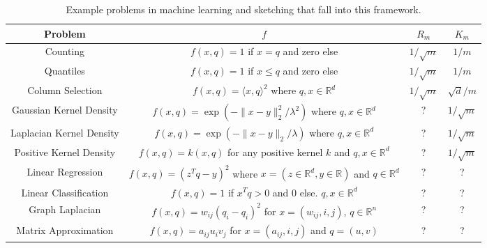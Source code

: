 \documentclass{article} %
\newcommand{\R}{\mathbb{R}}
\begin{document}
\newcommand{\ccc}[1]{\parbox}
\begin{table}[htp]
\begin{center}
\begin{tabular}{|c|c|c|c|} \hline
Problem				& $f$ 											& $R_m$ 			& $K_m$ \\ \hline
Counting 				& $f(x, q) = 1$ if $x=q$ and zero else 					& $1/\sqrt{m}$		& $1/m$ \\ \hline
Quantiles				& $f(x, q) = 1$ if $x\le q$ and zero else  					& $1/\sqrt{m}$		& $1/m$ \\ \hline
Column Selection		& $f(x, q) = \langle x,q \rangle ^2$ where  $q,x\in \R^d$		& $1/\sqrt{m}$		& $\sqrt{d}/m$ \\ \hline
Gaussian Kernel Density 			& $f(x, q) = \exp(- \|x-y\|_2^2/\lambda^2)$ where  $q,x\in \R^d$				& ? 		& $1/\sqrt{m}$ \\ \hline
Laplacian Kernel Density 			& $f(x, q) = \exp(- \|x-y\|_2/\lambda)$ where  $q,x\in \R^d$				& ? 		& $1/\sqrt{m}$ \\ \hline
Positive Kernel Density 			& $f(x, q) = k(x,q)$ for any positive kernel $k$ and $q,x\in \R^d$				& ? 		& $1/\sqrt{m}$ \\ \hline

Linear Regression		& $f(x,q) = (z^Tq - y)^2$ where $x = (z\in\R^d,y\in \R)$ and $q\in \R^d$					& ?				& ? \\ \hline
Linear Classification		& $f(x,q) = 1$ if $x^Tq > 0$ and $0$ else. $q,x\in \R^d$					& ?				& ? \\ \hline
Graph Laplacian 		& $f(x, q) = w_{ij}(q_i - q_i)^2$ for $x = (w_{ij},i,j)$, $q \in \R^n$ & ?				& ? \\ \hline
Matrix Approximation  	& $f(x, q) = a_{ij}u_iv_j$ for $x = (a_{ij},i,j)$  and $q = (u,v)$ 	& ?				& ? \\ \hline
\end{tabular}
\caption{Example problems in machine learning and sketching that fall into this framework.}
\end{center}
\label{default}
\end{table}%
\end{document}
